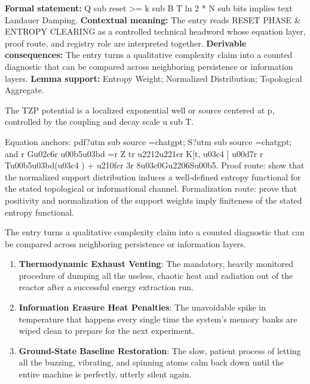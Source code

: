 \begingroup\footnotesize\setlength{\emergencystretch}{3em}\sloppy
\textbf{Formal statement:} Q sub reset >= k sub B T ln 2 * N sub bits implies text Landauer Damping. \textbf{Contextual meaning:} The entry reads RESET PHASE \& ENTROPY CLEARING as a controlled technical headword whose equation layer, proof route, and registry role are interpreted together. \textbf{Derivable consequences:} The entry turns a qualitative complexity claim into a counted diagnostic that can be compared across neighboring persistence or information layers. \textbf{Lemma support:} Entropy Weight; Normalized Distribution; Topological Aggregate.\par
\endgroup

The TZP potential is a localized exponential well or source centered at p, controlled by the coupling and decay scale u sub T.

Equation anchors: pdf?utm sub source =chatgpt; S?utm sub source =chatgpt; and r Gu02c6r u00b5u03bd =r Z tr u2212u221er K[t, u03c4 ] u00d7r r Tu00b5u03bd(u03c4 ) + u210fcr 3r 8u03c0Gu2206Su00b5. Proof route: show that the normalized support distribution induces a well-defined entropy functional for the stated topological or informational channel. Formalization route: prove that positivity and normalization of the support weights imply finiteness of the stated entropy functional.

The entry turns a qualitative complexity claim into a counted diagnostic that can be compared across neighboring persistence or information layers.
\endgroup

\begin{enumerate}[leftmargin=1.6em,itemsep=6pt,topsep=4pt]
\item \textbf{Thermodynamic Exhaust Venting}: The mandatory, heavily monitored procedure of dumping all the useless, chaotic heat and radiation out of the reactor after a successful energy extraction run.
\item \textbf{Information Erasure Heat Penalties}: The unavoidable spike in temperature that happens every single time the system's memory banks are wiped clean to prepare for the next experiment.
\item \textbf{Ground-State Baseline Restoration}: The slow, patient process of letting all the buzzing, vibrating, and spinning atoms calm back down until the entire machine is perfectly, utterly silent again.
\end{enumerate}

